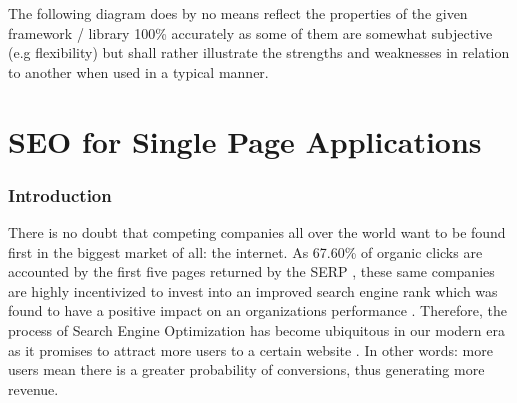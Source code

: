 The following diagram does by no means reflect the properties of the given framework / library 100\% accurately as some of them are somewhat subjective (e.g flexibility) but shall rather illustrate the strengths and weaknesses in relation to another when used in a typical manner.

\newcommand\ColorBox[1]{\textcolor{#1}{\rule{2ex}{2ex}}}



\section{SEO for Single Page Applications}

\subsubsection{Introduction}
There is no doubt that competing companies all over the world want to be found first in the biggest market of all: the internet. As 67.60\% of organic clicks are accounted by the first five pages returned by the SERP \cite{Khan2018:article}, these same companies are highly incentivized to invest into an improved search engine rank which was found to have a positive impact on an organizations performance \cite{yang2015search:article}. Therefore, the process of Search Engine Optimization has become ubiquitous in our modern era as it promises to attract more users to a certain website \cite{Khan2018:article}. In other words: more users mean there is a greater probability of conversions, thus generating more revenue.

